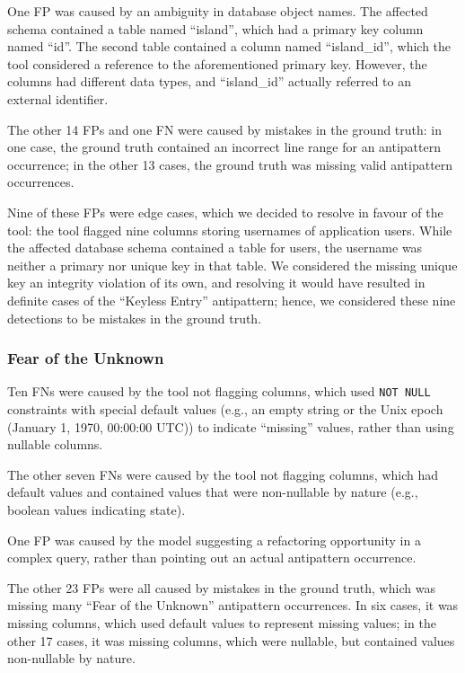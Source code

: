 One FP was caused by an ambiguity in database object names. The affected schema contained a table named “island”, which had a primary key column named “id”. The second table contained a column named “island\_id”, which the tool considered a reference to the aforementioned primary key. However, the columns had different data types, and “island\_id” actually referred to an external identifier.

The other 14 FPs and one FN were caused by mistakes in the ground truth: in one case, the ground truth contained an incorrect line range for an antipattern occurrence; in the other 13 cases, the ground truth was missing valid antipattern occurrences.

Nine of these FPs were edge cases, which we decided to resolve in favour of the tool: the tool flagged nine columns storing usernames of application users. While the affected database schema contained a table for users, the username was neither a primary nor unique key in that table. We considered the missing unique key an integrity violation of its own, and resolving it would have resulted in definite cases of the “Keyless Entry” antipattern; hence, we considered these nine detections to be mistakes in the ground truth.

\subsubsection*{Fear of the Unknown}
Ten FNs were caused by the tool not flagging columns, which used \texttt{NOT NULL} constraints with special default values (e.g., an empty string or the Unix epoch (January 1, 1970, 00:00:00 UTC)) to indicate “missing” values, rather than using nullable columns.

The other seven FNs were caused by the tool not flagging columns, which had default values and contained values that were non-nullable by nature (e.g., boolean values indicating state).

One FP was caused by the model suggesting a refactoring opportunity in a complex query, rather than pointing out an actual antipattern occurrence.

The other 23 FPs were all caused by mistakes in the ground truth, which was missing many “Fear of the Unknown” antipattern occurrences. In six cases, it was missing columns, which used default values to represent missing values; in the other \num{17} cases, it was missing columns, which were nullable, but contained values non-nullable by nature.

